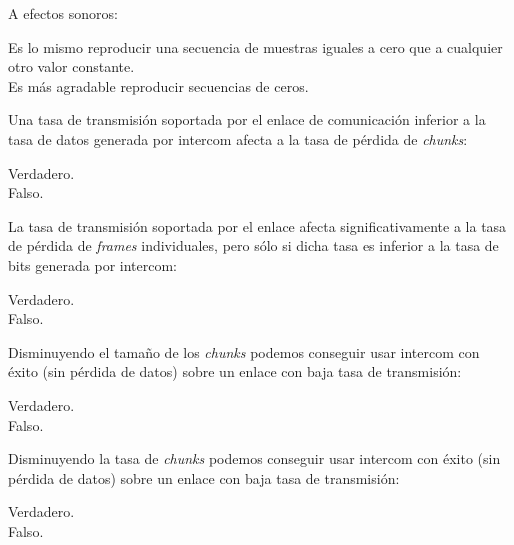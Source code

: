 \documentclass[legalpaper, 12pt, addpoints]{exam}
\begin{document}
\begin{questions}
\vspace{0.10in}

\question A efectos sonoros:

\begin{oneparchoices}
  \choice Es lo mismo reproducir una secuencia de muestras iguales a cero que a cualquier otro valor constante.\\
  \choice Es más agradable reproducir secuencias de ceros.
\end{oneparchoices}
  
\vspace{0.10in}

\question Una tasa de transmisión soportada por el enlace de comunicación inferior a la tasa de datos generada por intercom afecta a la tasa de pérdida de \emph{chunks}:

\begin{oneparchoices}
  \choice Verdadero.\\
  \choice Falso.
\end{oneparchoices}
  
\vspace{0.10in}

\question La tasa de transmisión soportada por el enlace afecta significativamente a la tasa de pérdida de \emph{frames} individuales, pero sólo si dicha tasa es inferior a la tasa de bits generada por intercom:

\begin{oneparchoices}
  \choice Verdadero.\\
  \choice Falso.
\end{oneparchoices}
  
\vspace{0.10in}

\question Disminuyendo el tamaño de los \emph{chunks} podemos conseguir usar intercom con éxito (sin pérdida de datos) sobre un enlace con baja tasa de transmisión:

\begin{oneparchoices}
  \choice Verdadero.\\
  \choice Falso.
\end{oneparchoices}
  
\vspace{0.10in}

\question Disminuyendo la tasa de \emph{chunks} podemos conseguir usar intercom con éxito (sin pérdida de datos) sobre un enlace con baja tasa de transmisión:

\begin{oneparchoices}
  \choice Verdadero.\\
  \choice Falso.
\end{oneparchoices}
  

\end{questions}
\end{document}
